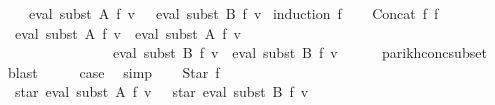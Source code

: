 \begin{isabellebody}
\ \ \ {\isachardoublequoteopen}{\isasymPsi}\ {\isacharparenleft}{\kern0pt}eval\ {\isacharparenleft}{\kern0pt}subst\ A\ f{\isacharparenright}{\kern0pt}\ v{\isacharparenright}{\kern0pt}\ {\isasymsubseteq}\ {\isasymPsi}\ {\isacharparenleft}{\kern0pt}eval\ {\isacharparenleft}{\kern0pt}subst\ B\ f{\isacharparenright}{\kern0pt}\ v{\isacharparenright}{\kern0pt}{\isachardoublequoteclose}\isanewline
%
\isadelimproof
%
\endisadelimproof
%
\isatagproof
{}\isamarkupfalse%
\ {\isacharparenleft}{\kern0pt}induction\ f{\isacharparenright}{\kern0pt}\isanewline
\ \ \isamarkupfalse%
\ {\isacharparenleft}{\kern0pt}Concat\ f{}\ f{}{\isacharparenright}{\kern0pt}\isanewline
\ \ \isamarkupfalse%
\ \isamarkupfalse%
\ {\isachardoublequoteopen}{\isasymPsi}\ {\isacharparenleft}{\kern0pt}eval\ {\isacharparenleft}{\kern0pt}subst\ A\ f{}{\isacharparenright}{\kern0pt}\ v\ {\isacharat}{\kern0pt}{\isacharat}{\kern0pt}\ eval\ {\isacharparenleft}{\kern0pt}subst\ A\ f{}{\isacharparenright}{\kern0pt}\ v{\isacharparenright}{\kern0pt}\isanewline
\ \ \ \ \ \ \ \ \ \ \ \ \ \ {\isasymsubseteq}\ {\isasymPsi}\ {\isacharparenleft}{\kern0pt}eval\ {\isacharparenleft}{\kern0pt}subst\ B\ f{}{\isacharparenright}{\kern0pt}\ v\ {\isacharat}{\kern0pt}{\isacharat}{\kern0pt}\ eval\ {\isacharparenleft}{\kern0pt}subst\ B\ f{}{\isacharparenright}{\kern0pt}\ v{\isacharparenright}{\kern0pt}{\isachardoublequoteclose}\isanewline
\ \ \ \ \isamarkupfalse%
\ parikh{\isacharunderscore}{\kern0pt}conc{\isacharunderscore}{\kern0pt}subset\ \isamarkupfalse%
\ blast\isanewline
\ \ \isamarkupfalse%
\ \isamarkupfalse%
\ {\isacharquery}{\kern0pt}case\ \isamarkupfalse%
\ simp\isanewline
{}\isamarkupfalse%
\isanewline
\ \ \isamarkupfalse%
\ {\isacharparenleft}{\kern0pt}Star\ f{\isacharparenright}{\kern0pt}\isanewline
\ \ \isamarkupfalse%
\ \isamarkupfalse%
\ {\isachardoublequoteopen}{\isasymPsi}\ {\isacharparenleft}{\kern0pt}star\ {\isacharparenleft}{\kern0pt}eval\ {\isacharparenleft}{\kern0pt}subst\ A\ f{\isacharparenright}{\kern0pt}\ v{\isacharparenright}{\kern0pt}{\isacharparenright}{\kern0pt}\ {\isasymsubseteq}\ {\isasymPsi}\ {\isacharparenleft}{\kern0pt}star\ {\isacharparenleft}{\kern0pt}eval\ {\isacharparenleft}{\kern0pt}subst\ B\ f{\isacharparenright}{\kern0pt}\ v{\isacharparenright}{\kern0pt}{\isacharparenright}{\kern0pt}{\isachardoublequoteclose}\isanewline

\end{isabellebody}
